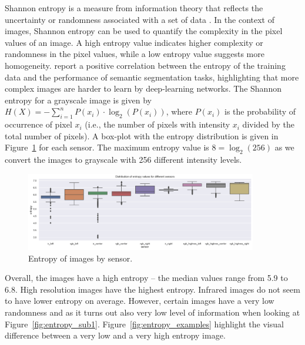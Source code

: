 \documentclass[Master,MDS,english]{BASE/twbook} %
\begin{document}
Shannon entropy is a measure from information theory that reflects the uncertainty or randomness associated with a set of data \citep{6773024}. In the context of images, Shannon entropy can be used to quantify the complexity in the pixel values of an image. A high entropy value indicates higher complexity or randomness in the pixel values, while a low entropy value suggests more homogeneity. \cite{rahane2020measures} report a positive correlation between the entropy of the training data and the performance of semantic segmentation tasks, highlighting that more complex images are harder to learn by deep-learning networks.
The Shannon entropy for a grayscale image is given by $H(X) = -\sum_{i=1}^{n} P(x_i) \cdot \log_2(P(x_i))$, where $P(x_i)$ is the probability of occurrence of pixel $x_i$ (i.e., the number of pixels with intensity $x_i$ divided by the total number of pixels). 
A box-plot with the entropy distribution is given in Figure~\ref{fig:entropy} for each sensor. The maximum entropy value is $8 = \log_2(256)$ as we convert the images to grayscale with 256 different intensity levels.


\begin{figure}[h]
\centering
\includegraphics[width=0.9\textwidth]{images/datasets/db/entropy}
\caption{Entropy of images by sensor. }
\label{fig:entropy}
\end{figure}

Overall, the images have a high entropy -- the median values range from 5.9 to 6.8. High resolution images have the highest entropy. Infrared images do not seem to have lower entropy on average. However, certain images have a very low randomness and as it turns out also very low level of information when looking at Figure~\ref{fig:entropy_sub1}. Figure~\ref{fig:entropy_examples} highlight the visual difference between a very low and a very high entropy image.
\end{document}
